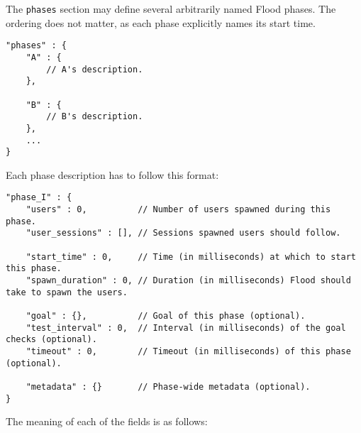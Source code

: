 \documentclass[a4paper]{article}
\begin{document}
The \texttt{phases} section may define several arbitrarily named Flood phases. The ordering does not matter, as each phase explicitly names its start time.


\begin{verbatim}
"phases" : {
    "A" : {
        // A's description.
    },

    "B" : {
        // B's description.
    },
    ...
}
\end{verbatim}




\noindent
Each phase description has to follow this format:


\begin{verbatim}
"phase_I" : {
    "users" : 0,          // Number of users spawned during this phase.
    "user_sessions" : [], // Sessions spawned users should follow.

    "start_time" : 0,     // Time (in milliseconds) at which to start this phase.
    "spawn_duration" : 0, // Duration (in milliseconds) Flood should take to spawn the users.

    "goal" : {},          // Goal of this phase (optional).
    "test_interval" : 0,  // Interval (in milliseconds) of the goal checks (optional).
    "timeout" : 0,        // Timeout (in milliseconds) of this phase (optional).

    "metadata" : {}       // Phase-wide metadata (optional).
}
\end{verbatim}




\noindent
The meaning of each of the fields is as follows:
\end{document}
